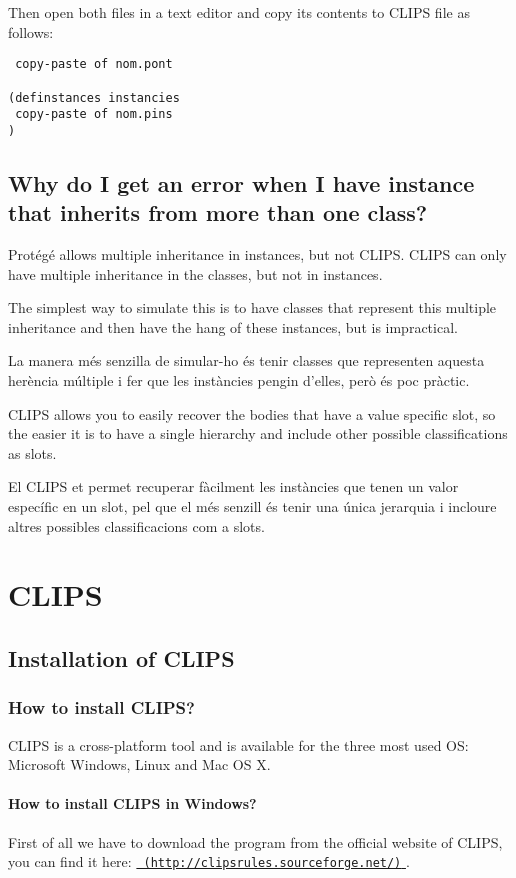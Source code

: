 \documentclass[11pt,svgnames]{scrbook}
\begin{document}
Then open both files in a text editor and copy its contents to
CLIPS file as follows:
\begin{verbatim}
 copy-paste of nom.pont

(definstances instancies
 copy-paste of nom.pins
)
\end{verbatim}

\section{Why do I get an error when I have instance that inherits from more than one class?}
Protégé allows multiple inheritance in instances, but not CLIPS. CLIPS can only have multiple inheritance in the classes, but not in instances.

The simplest way to simulate this is to have classes that represent this
multiple inheritance and then have the hang of these instances, but is impractical.

La manera més senzilla de simular-ho és tenir classes que representen aquesta
herència múltiple i fer que les instàncies pengin d'elles, però és poc pràctic.

CLIPS allows you to easily recover the bodies that have a value
specific slot, so the easier it is to have a single hierarchy and
include other possible classifications as slots.

El CLIPS et permet recuperar fàcilment les instàncies que tenen un valor
específic en un slot, pel que el més senzill és tenir una única jerarquia i
incloure altres possibles classificacions com a slots.


\chapter{CLIPS}
\section{Installation of CLIPS}

\subsection{How to install CLIPS?}
CLIPS is a cross-platform tool and is available for the three
most used OS: Microsoft Windows, Linux and Mac OS X.

\subsubsection*{How to install CLIPS in Windows?}
First of all we have to download the program from the official website of CLIPS, you can find it here:\break
\href{http://clipsrules.sourceforge.net/}{\texttt{
(http://clipsrules.sourceforge.net/)} }. 
\end{document}
